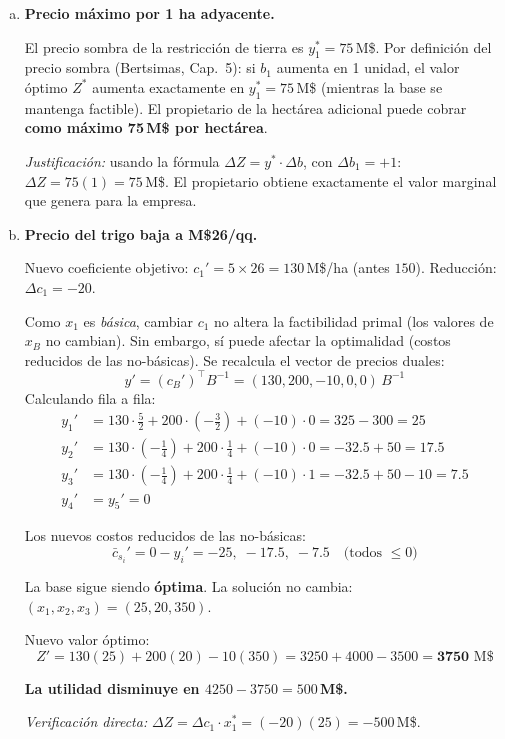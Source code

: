 \documentclass{article}
\begin{document}
\begin{enumerate}[a)]
Los costos reducidos de la fila $Z$ son $\bar{c}_{s_i}=-y_i^*$, con $y_1^*=75$, $y_2^*=12.5$, $y_3^*=2.5$. Todos $\leq0$: \textbf{óptimo}. \checkmark

\item \textbf{Precio máximo por 1 ha adyacente.}

El precio sombra de la restricción de tierra es $y_1^*=75$\,M\$. Por definición del precio sombra (Bertsimas, Cap.~5): si $b_1$ aumenta en 1 unidad, el valor óptimo $Z^*$ aumenta exactamente en $y_1^*=75$\,M\$ (mientras la base se mantenga factible). El propietario de la hectárea adicional puede cobrar \textbf{como máximo 75\,M\$ por hectárea}.

\textit{Justificación:} usando la fórmula $\Delta Z = y^*\cdot\Delta b$, con $\Delta b_1=+1$: $\Delta Z=75(1)=75$\,M\$. El propietario obtiene exactamente el valor marginal que genera para la empresa.

\item \textbf{Precio del trigo baja a M\$26/qq.}

Nuevo coeficiente objetivo: $c_1'=5\times26=130$\,M\$/ha (antes $150$). Reducción: $\Delta c_1=-20$.

Como $x_1$ es \emph{básica}, cambiar $c_1$ no altera la factibilidad primal (los valores de $x_B$ no cambian). Sin embargo, sí puede afectar la optimalidad (costos reducidos de las no-básicas). Se recalcula el vector de precios duales:
$$y'=(c_B')^\top B^{-1}=(130,200,-10,0,0)\,B^{-1}$$
Calculando fila a fila:
\begin{align*}
y_1' &= 130\cdot\tfrac{5}{2}+200\cdot(-\tfrac{3}{2})+(-10)\cdot0 = 325-300=25\\
y_2' &= 130\cdot(-\tfrac{1}{4})+200\cdot\tfrac{1}{4}+(-10)\cdot0 = -32.5+50=17.5\\
y_3' &= 130\cdot(-\tfrac{1}{4})+200\cdot\tfrac{1}{4}+(-10)\cdot1 = -32.5+50-10=7.5\\
y_4'&=y_5'=0
\end{align*}

Los nuevos costos reducidos de las no-básicas:
$$\bar{c}_{s_i}'= 0 - y_i' = -25,\;-17.5,\;-7.5 \quad\text{(todos }\leq0\text{)}$$

La base sigue siendo \textbf{óptima}. La solución no cambia: $(x_1,x_2,x_3)=(25,20,350)$.

Nuevo valor óptimo:
$$Z'=130(25)+200(20)-10(350)=3250+4000-3500=\mathbf{3750}\text{ M\$}$$

\textbf{La utilidad disminuye en $4250-3750=500$\,M\$.}

\textit{Verificación directa:} $\Delta Z = \Delta c_1 \cdot x_1^* = (-20)(25)=-500$\,M\$. \checkmark


\end{enumerate}
\end{document}

